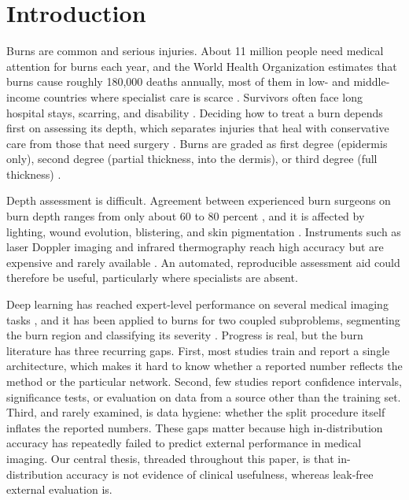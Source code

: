 \documentclass{elektr}
\begin{document}
\section{Introduction}
\label{Int}
Burns are common and serious injuries. About 11 million people need medical attention for burns each year, and the World Health Organization estimates that burns cause roughly 180{,}000 deaths annually, most of them in low- and middle-income countries where specialist care is scarce \cite{who,peck}. Survivors often face long hospital stays, scarring, and disability \cite{brusselaers}. Deciding how to treat a burn depends first on assessing its depth, which separates injuries that heal with conservative care from those that need surgery \cite{jackson}. Burns are graded as first degree (epidermis only), second degree (partial thickness, into the dermis), or third degree (full thickness) \cite{heimbach}.

Depth assessment is difficult. Agreement between experienced burn surgeons on burn depth ranges from only about 60 to 80 percent \cite{jaskille}, and it is affected by lighting, wound evolution, blistering, and skin pigmentation \cite{monstrey}. Instruments such as laser Doppler imaging and infrared thermography reach high accuracy but are expensive and rarely available \cite{dang}. An automated, reproducible assessment aid could therefore be useful, particularly where specialists are absent.

Deep learning has reached expert-level performance on several medical imaging tasks \cite{esteva,litjens}, and it has been applied to burns for two coupled subproblems, segmenting the burn region and classifying its severity \cite{boissin}. Progress is real, but the burn literature has three recurring gaps. First, most studies train and report a single architecture, which makes it hard to know whether a reported number reflects the method or the particular network. Second, few studies report confidence intervals, significance tests, or evaluation on data from a source other than the training set. Third, and rarely examined, is data hygiene: whether the split procedure itself inflates the reported numbers. These gaps matter because high in-distribution accuracy has repeatedly failed to predict external performance in medical imaging. Our central thesis, threaded throughout this paper, is that in-distribution accuracy is not evidence of clinical usefulness, whereas leak-free external evaluation is.
\end{document}
